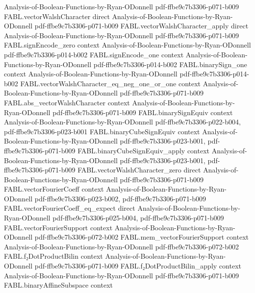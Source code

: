 \begin{theorem}
  {Analysis-of-Boolean-Functions-by-Ryan-ODonnell}
  {pdf-ffbe9c7b3306-p071-b009}
\proofstep
  {FABL.vectorWalshCharacter}
  {direct}
  {Analysis-of-Boolean-Functions-by-Ryan-ODonnell}
  {pdf-ffbe9c7b3306-p071-b009}
\proofstep
  {FABL.vectorWalshCharacter_apply}
  {direct}
  {Analysis-of-Boolean-Functions-by-Ryan-ODonnell}
  {pdf-ffbe9c7b3306-p071-b009}
\proofstep
  {FABL.signEncode_zero}
  {context}
  {Analysis-of-Boolean-Functions-by-Ryan-ODonnell}
  {pdf-ffbe9c7b3306-p014-b002}
\proofstep
  {FABL.signEncode_one}
  {context}
  {Analysis-of-Boolean-Functions-by-Ryan-ODonnell}
  {pdf-ffbe9c7b3306-p014-b002}
\proofstep
  {FABL.binarySign_one}
  {context}
  {Analysis-of-Boolean-Functions-by-Ryan-ODonnell}
  {pdf-ffbe9c7b3306-p014-b002}
\proofstep
  {FABL.vectorWalshCharacter_eq_neg_one_or_one}
  {context}
  {Analysis-of-Boolean-Functions-by-Ryan-ODonnell}
  {pdf-ffbe9c7b3306-p071-b009}
\proofstep
  {FABL.abs_vectorWalshCharacter}
  {context}
  {Analysis-of-Boolean-Functions-by-Ryan-ODonnell}
  {pdf-ffbe9c7b3306-p071-b009}
\proofstep
  {FABL.binarySignEquiv}
  {context}
  {Analysis-of-Boolean-Functions-by-Ryan-ODonnell}
  {pdf-ffbe9c7b3306-p022-b004,
    pdf-ffbe9c7b3306-p023-b001}
\proofstep
  {FABL.binaryCubeSignEquiv}
  {context}
  {Analysis-of-Boolean-Functions-by-Ryan-ODonnell}
  {pdf-ffbe9c7b3306-p023-b001,
    pdf-ffbe9c7b3306-p071-b009}
\proofstep
  {FABL.binaryCubeSignEquiv_apply}
  {context}
  {Analysis-of-Boolean-Functions-by-Ryan-ODonnell}
  {pdf-ffbe9c7b3306-p023-b001,
    pdf-ffbe9c7b3306-p071-b009}
\proofstep
  {FABL.vectorWalshCharacter_zero}
  {direct}
  {Analysis-of-Boolean-Functions-by-Ryan-ODonnell}
  {pdf-ffbe9c7b3306-p071-b009}
\proofstep
  {FABL.vectorFourierCoeff}
  {context}
  {Analysis-of-Boolean-Functions-by-Ryan-ODonnell}
  {pdf-ffbe9c7b3306-p023-b002,
    pdf-ffbe9c7b3306-p071-b009}
\proofstep
  {FABL.vectorFourierCoeff_eq_expect}
  {direct}
  {Analysis-of-Boolean-Functions-by-Ryan-ODonnell}
  {pdf-ffbe9c7b3306-p025-b004,
    pdf-ffbe9c7b3306-p071-b009}
\proofstep
  {FABL.vectorFourierSupport}
  {context}
  {Analysis-of-Boolean-Functions-by-Ryan-ODonnell}
  {pdf-ffbe9c7b3306-p072-b002}
\proofstep
  {FABL.mem_vectorFourierSupport}
  {context}
  {Analysis-of-Boolean-Functions-by-Ryan-ODonnell}
  {pdf-ffbe9c7b3306-p072-b002}
\proofstep
  {FABL.f₂DotProductBilin}
  {context}
  {Analysis-of-Boolean-Functions-by-Ryan-ODonnell}
  {pdf-ffbe9c7b3306-p071-b009}
\proofstep
  {FABL.f₂DotProductBilin_apply}
  {context}
  {Analysis-of-Boolean-Functions-by-Ryan-ODonnell}
  {pdf-ffbe9c7b3306-p071-b009}
\proofstep
  {FABL.binaryAffineSubspace}
  {context}

\end{theorem}
